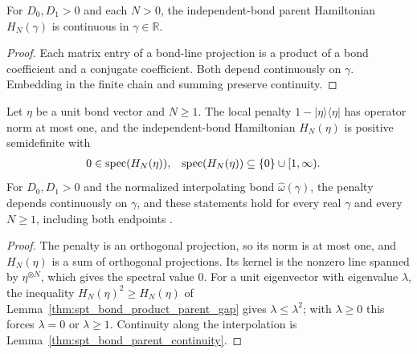 \begin{lemma}
    \label{thm:spt_bond_parent_continuity}
    \leanok
    For $D_0,D_1>0$ and each $N>0$, the independent-bond parent
    Hamiltonian $H_N(\gamma)$ is continuous in $\gamma\in\mathbb R$.
\end{lemma}

\begin{proof}\leanok
    Each matrix entry of a bond-line projection is a product of a bond
    coefficient and a conjugate coefficient. Both depend continuously
    on $\gamma$. Embedding in the finite chain and summing preserve
    continuity.
\end{proof}

\begin{lemma}
    \label{lem:spt_independent_bond_gap}
    \leanok
    Let $\eta$ be a unit bond vector and $N\geq1$. The local penalty
    $1-|\eta\rangle\langle\eta|$ has operator norm at most one, and the
    independent-bond Hamiltonian $H_N(\eta)$ is positive semidefinite with
    \begin{align}
        0                              & \in\operatorname{spec}(H_N(\eta)), &
        \operatorname{spec}(H_N(\eta)) & \subseteq\{0\}\cup[1,\infty).
        \notag
    \end{align}
    For $D_0,D_1>0$ and the normalized interpolating bond
    $\widehat\omega(\gamma)$, the penalty depends continuously on
    $\gamma$, and these statements hold for every real $\gamma$ and every
    $N\geq1$, including both endpoints
    \cite[Section~II.F.2, lines~899--906]{Schuch2011Phases}.
\end{lemma}

\begin{proof}\leanok
    The penalty is an orthogonal projection, so its norm is at most one,
    and $H_N(\eta)$ is a sum of orthogonal projections. Its kernel is the
    nonzero line spanned by $\eta^{\otimes N}$, which gives the spectral
    value $0$. For a unit eigenvector with eigenvalue $\lambda$, the
    inequality $H_N(\eta)^2\geq H_N(\eta)$ of
    Lemma~\ref{thm:spt_bond_product_parent_gap} gives
    $\lambda\leq\lambda^2$; with $\lambda\geq0$ this forces $\lambda=0$ or
    $\lambda\geq1$. Continuity along the interpolation is
    Lemma~\ref{thm:spt_bond_parent_continuity}.
\end{proof}

